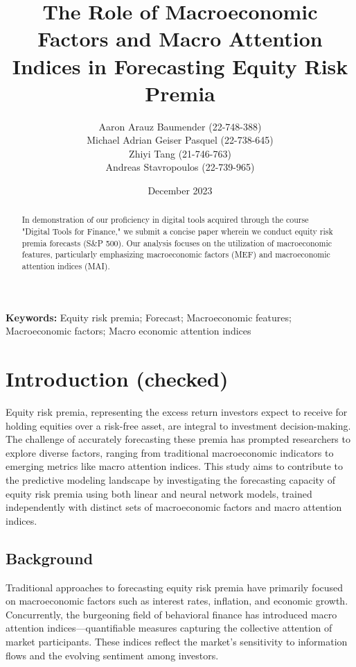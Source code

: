 \documentclass{article}
\title{The Role of Macroeconomic Factors and Macro Attention Indices in Forecasting Equity Risk Premia}
\author{Aaron Arauz Baumender (22-748-388) 
\\  Michael Adrian Geiser Pasquel (22-738-645) 
\\ Zhiyi Tang (21-746-763) 
\\ Andreas Stavropoulos (22-739-965)}
\affil{University of Zurich}
\date{December 2023}
\providecommand{\keywords}[1]{\small \textbf{Keywords:} #1}
\begin{document}
\maketitle

\begin{abstract} 
\noindent In demonstration of our proficiency in digital tools acquired through the course "Digital Tools for Finance," we submit a concise paper wherein we conduct equity risk premia forecasts (S\&P 500). Our analysis focuses on the utilization of macroeconomic features, particularly emphasizing macroeconomic factors (MEF) and macroeconomic attention indices (MAI).
\end{abstract}

\hfill

\noindent \keywords{Equity risk premia; Forecast; Macroeconomic features; Macroeconomic factors; Macro economic attention indices}\\

\newpage

\tableofcontents

\newpage

\section{Introduction (checked)}

Equity risk premia, representing the excess return investors expect to receive for holding equities over a risk-free asset, are integral to investment decision-making. The challenge of accurately forecasting these premia has prompted researchers to explore diverse factors, ranging from traditional macroeconomic indicators to emerging metrics like macro attention indices. This study aims to contribute to the predictive modeling landscape by investigating the forecasting capacity of equity risk premia using both linear and neural network models, trained independently with distinct sets of macroeconomic factors and macro attention indices.

\subsection{Background}

Traditional approaches to forecasting equity risk premia have primarily focused on macroeconomic factors such as interest rates, inflation, and economic growth. Concurrently, the burgeoning field of behavioral finance has introduced macro attention indices—quantifiable measures capturing the collective attention of market participants. These indices reflect the market's sensitivity to information flows and the evolving sentiment among investors.
\end{document}
